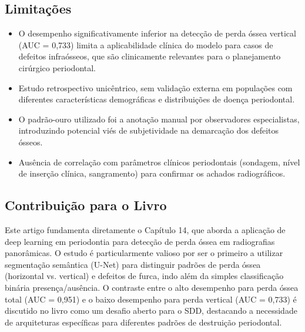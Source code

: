 \subsection{Limitações}
\begin{itemize}
  \item O desempenho significativamente inferior na detecção de perda óssea
        vertical (AUC = 0,733) limita a aplicabilidade clínica do modelo
        para casos de defeitos infraósseos, que são clinicamente relevantes
        para o planejamento cirúrgico periodontal.
  \item Estudo retrospectivo unicêntrico, sem validação externa em
        populações com diferentes características demográficas e
        distribuições de doença periodontal.
  \item O padrão-ouro utilizado foi a anotação manual por observadores
        especialistas, introduzindo potencial viés de subjetividade na
        demarcação dos defeitos ósseos.
  \item Ausência de correlação com parâmetros clínicos periodontais
        (sondagem, nível de inserção clínica, sangramento) para confirmar
        os achados radiográficos.
\end{itemize}

\subsection{Contribuição para o Livro}
Este artigo fundamenta diretamente o Capítulo 14, que aborda a aplicação
de deep learning em periodontia para detecção de perda óssea em
radiografias panorâmicas. O estudo é particularmente valioso por ser o
primeiro a utilizar segmentação semântica (U-Net) para distinguir padrões
de perda óssea (horizontal vs. vertical) e defeitos de furca, indo além
da simples classificação binária presença/ausência. O contraste entre o
alto desempenho para perda óssea total (AUC = 0,951) e o baixo desempenho
para perda vertical (AUC = 0,733) é discutido no livro como um desafio
aberto para o SDD, destacando a necessidade de arquiteturas específicas
para diferentes padrões de destruição periodontal.

